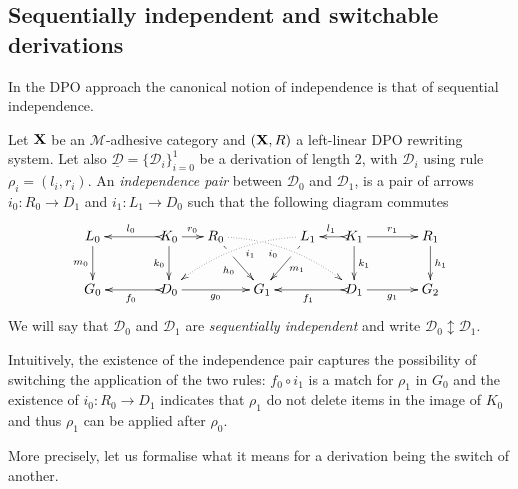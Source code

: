 \documentclass[a4paper,UKenglish,cleveref,pdftex, thm-restate,numberwithinsect,anonymous]{lipics}
\def\R{\mathsf{R}}
\def\X{\textbf {\textup{X}}}
\def\G{\textbf {\textup{G}}}
\newcommand{\dder}[1]{\mathscr{#1}}
\newcommand{\der}[1]{\underline{\dder{#1}}}
\newcommand{\seqind}{\ensuremath{\updownarrow}}
\begin{document}
\subsection{Sequentially independent and switchable derivations }\label{subsec:switch}



In the DPO approach the canonical notion of independence is that of sequential independence.

\begin{definition}
  \label{de:sequential-independence}
  Let $\X$ be an $\mathcal{M}$-adhesive category 
  and $(\X, \R)$ a left-linear DPO rewriting system. 
  Let also
  $\der{D}=\{\dder{D}_i\}_{i=0}^1$ be a derivation of length $2$, with
  $\dder{D}_i$ using rule $\rho_i = (l_i,r_i)$.  An \emph{independence
    pair} between $\dder{D}_0$ and $\dder{D}_1$, is a pair of arrows
  $i_0\colon R_0\to D_1$ and $i_1\colon L_1\to D_0$ such that the
  following diagram commutes
  \[\xymatrix@C=15pt{L_0 \ar[d]_{m_0}&& K_0
      \ar[d]_{k_0}\ar@{>->}[ll]_{l_0} \ar[r]^{r_0} & R_0
      \ar@{.>}@/^.35cm/[drrr]|(.3)\hole_(.4){i_0}
      \ar[dr]|(.3)\hole_{h_0} && L_1 \ar@{.>}@/_.35cm/[dlll]^(.4){i_1}
      \ar[dl]|(.3)\hole^{m_1}& K_1 \ar[d]^{k_1}\ar@{>->}[l]_{l_1}
      \ar[rr]^{r_1} && R_1 \ar[d]^{h_1}\\G_0 && \ar@{>->}[ll]^{f_0}
      D_0 \ar[rr]_{g_0}&& G_1 && \ar@{>->}[ll]^{f_1} D_1
      \ar[rr]_{g_1}&& G_2}\] We will say that $\dder{D}_0$ and
  $\dder{D}_1$ are
  \emph{sequentially independent} and write $\dder{D}_0 \seqind \dder{D}_1$.
\end{definition}

Intuitively, the existence of the independence pair
captures the possibility of switching the application of the two rules:
$f_0 \circ i_1$ is a match for $\rho_1$ in $G_0$ and the
existence of $i_0 : R_0 \to D_1$ indicates that $\rho_1$ do not delete
items in the image of $K_0$ and thus $\rho_1$ can be applied after
$\rho_0$.

More precisely, let us formalise what it means for a derivation being the switch of another.

\end{document}
